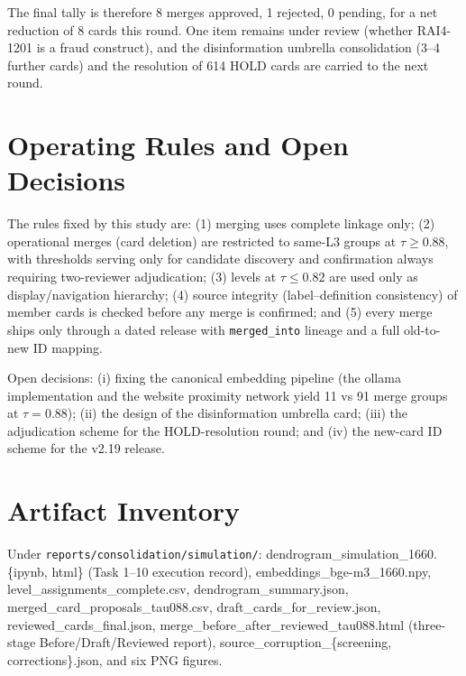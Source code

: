 \documentclass[11pt,a4paper]{article}
\begin{document}
The final tally is therefore 8 merges approved, 1 rejected, 0 pending, for a net reduction of 8 cards this round. One item remains under review (whether RAI4-1201 is a fraud construct), and the disinformation umbrella consolidation (3--4 further cards) and the resolution of 614 HOLD cards are carried to the next round.

\section{Operating Rules and Open Decisions}

The rules fixed by this study are: (1) merging uses complete linkage only; (2) operational merges (card deletion) are restricted to same-L3 groups at $\tau \geq 0.88$, with thresholds serving only for candidate discovery and confirmation always requiring two-reviewer adjudication; (3) levels at $\tau \leq 0.82$ are used only as display/navigation hierarchy; (4) source integrity (label--definition consistency) of member cards is checked before any merge is confirmed; and (5) every merge ships only through a dated release with \texttt{merged\_into} lineage and a full old-to-new ID mapping.

Open decisions: (i) fixing the canonical embedding pipeline (the ollama implementation and the website proximity network yield 11 vs 91 merge groups at $\tau=0.88$); (ii) the design of the disinformation umbrella card; (iii) the adjudication scheme for the HOLD-resolution round; and (iv) the new-card ID scheme for the v2.19 release.

\section*{Artifact Inventory}

Under \texttt{reports/consolidation/simulation/}: dendrogram\_simulation\_1660.\{ipynb, html\} (Task 1--10 execution record), embeddings\_bge-m3\_1660.npy, level\_assignments\_complete.csv, dendrogram\_summary.json, merged\_card\_proposals\_tau088.csv, draft\_cards\_for\_review.json, reviewed\_cards\_final.json, merge\_before\_after\_reviewed\_tau088.html (three-stage Before/Draft/Reviewed report), source\_corruption\_\{screening, corrections\}.json, and six PNG figures.
\end{document}
